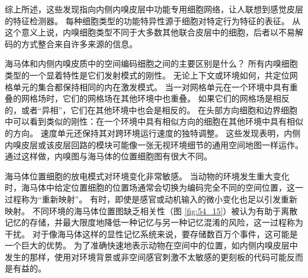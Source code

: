 综上所述，这些发现指向内侧内嗅皮层中功能专用细胞网络，让人联想到感觉皮层的特征检测器。 每种细胞类型的功能特异性源于细胞对特定行为特征的表征。 从这个意义上说，内嗅细胞类型不同于大多数其他联合皮层中的细胞，后者以不易解码的方式整合来自许多来源的信息。

海马体和内侧内嗅皮质中的空间编码细胞之间的主要区别是什么？ 所有内嗅细胞类型的一个显着特性是它们发射模式的刚性。 无论上下文或环境如何，共定位网格单元的集合都保持相同的内在激发模式。 当一对网格单元在一个环境中具有重叠的网格场时，它们的网格场在其他环境中也重叠。 如果它们的网格场是相反的，或者“异相”，它们在其他环境中也会是相反的。 在头部方向细胞和边界细胞中可以看到类似的刚性：在一个环境中具有相似方向的细胞在其他环境中具有相似的方向。 速度单元还保持其对跨环境运行速度的独特调整。 这些发现表明，内侧内嗅皮层或该皮层回路的模块可能像一张无视环境细节的通用空间地图一样运作。 通过这样做，内嗅图与海马体的位置细胞图有很大不同。

海马体位置细胞的放电模式对环境变化非常敏感。 当动物的环境发生重大变化时，海马体中给定位置细胞的位置场通常会切换为编码完全不同的空间位置，这一过程称为“重新映射”。 有时，即使是感官或动机输入的微小变化也足以引发重新映射。 不同环境的海马体位置图缺乏相关性（图 \ref{fig:54_15}）被认为有助于离散记忆的存储，并最大限度地降低一种记忆与另一种记忆混淆的风险，这一过程称为干扰。 对于像海马体这样的显性记忆系统来说，要存储数百万个事件，这可能是一个巨大的优势。 为了准确快速地表示动物在空间中的位置，如内侧内嗅皮层中发生的那样，使用对环境背景或非空间感官刺激不太敏感的更刻板的代码可能反而是有益的。


